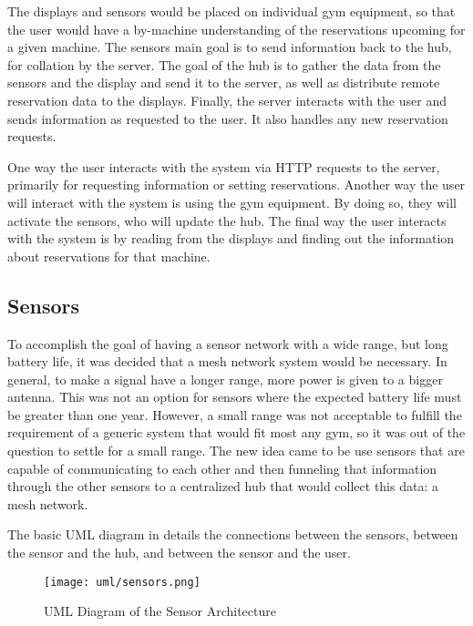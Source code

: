 \documentclass[PPFS.tex]{template/subfiles}
\begin{document}
The displays and sensors would be placed on individual gym equipment, so that the user would have a by-machine understanding of the reservations upcoming for a given machine. The sensors main goal is to send information back to the hub, for collation by the server. The goal of the hub is to gather the data from the sensors and the display and send it to the server, as well as distribute remote reservation data to the displays. Finally, the server interacts with the user and sends information as requested to the user. It also handles any new reservation requests.

One way the user interacts with the system via HTTP requests to the server, primarily for requesting information or setting reservations. Another way the user will interact with the system is using the gym equipment. By doing so, they will activate the sensors, who will update the hub. The final way the user interacts with the system is by reading from the displays and finding out the information about reservations for that machine.

\subsection{Sensors}

To accomplish the goal of having a sensor network with a wide range, but long battery life, it was decided that a mesh network system would be necessary. In general, to make a signal have a longer range, more power is given to a bigger antenna. This was not an option for sensors where the expected battery life must be greater than one year. However, a small range was not acceptable to fulfill the requirement of a generic system that would fit most any gym, so it was out of the question to settle for a small range. The new idea came to be use sensors that are capable of communicating to each other and then funneling that information through the other sensors to a centralized hub that would collect this data: a mesh network.

The basic UML diagram in  details the connections between the sensors, between the sensor and the hub, and between the sensor and the user.

\begin{figure}[H]
    \centering
    \texttt{[image: uml/sensors.png]}
    \caption{UML Diagram of the Sensor Architecture}
    \label{fig:sensor_arch}
\end{figure}
\end{document}
